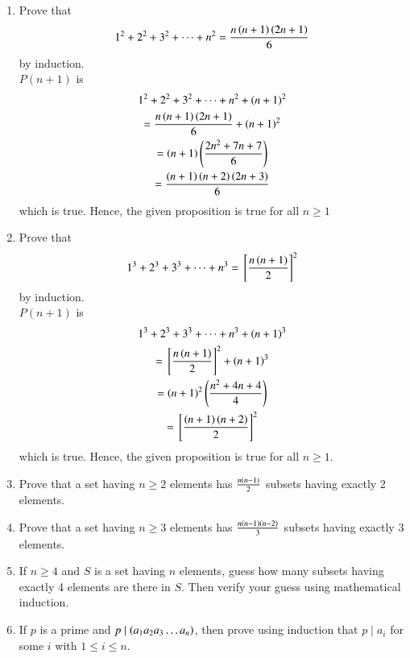 \renewcommand{\theequation}{\theenumi}

\begin{enumerate}[label=\arabic*.,ref=\thesubsection.\theenumi]
	\item Prove that 
		\begin{align}
			1^2 + 2^2 + 3^2 + \cdots + n^2 = \frac{n\left(n+1\right)\left(2n+1\right)}{6}
		\end{align}
		by induction.
		\\
		\solution $P(n+1)$ is 
		\begin{multline}
			1^2 + 2^2 + 3^2 + \cdots + n^2 +\left(n+1\right)^2 
			\\
			= \frac{n\left(n+1\right)\left(2n+1\right)}{6}+\left(n+1\right)^2
			\\
			= \left(n+1\right)\left(\frac{2n^2+7n + 7}{6}\right)
			\\
			= \frac{\left(n+1\right)\left(n+2\right)\left(2n+3\right)}{6}
		\end{multline}
		which is true.  Hence, the given proposition is true for all $n \ge 1$
	\item Prove that 
		\begin{align}
			1^3 + 2^3 + 3^3 + \cdots + n^3 = {}\left[\frac{n\left(n+1\right)}{2}\right]^2
		\end{align}
		by induction.
		\\
		\solution $P(n+1)$ is 
		\begin{multline}
			1^3 + 2^3 + 3^3 + \cdots + n^3 +\left(n+1\right)^3 
			\\
			= {}\left[\frac{n\left(n+1\right)}{2}\right]^2+\left(n+1\right)^3
			\\
			= \left(n+1\right)^2\left(\frac{n^2+4n + 4}{4}\right)
			\\
			= {}\left[\frac{\left(n+1\right)\left(n+2\right)}{2}\right]^2
		\end{multline}
		which is true.  Hence, the given proposition is true for all $n \ge 1$.
	\item Prove that a set having $n \ge 2$ elements has $\frac{n\left(n-1\right)}{2}$ subsets having exactly 2 elements.
	\item Prove that a set having $n \ge 3$ elements has $\frac{n\left(n-1\right)\left(n-2\right)}{3}$ subsets having exactly 3 elements.
	\item If $n \ge 4$ and $S$ is a set having $n$ elements, guess how many subsets having exactly 4 elements are there in $S$.  Then verify your guess using mathematical induction.
	\item If $p$ is a prime and $p \mid \left(a_1a_2a_3 \dots a_n\right)$, then prove using induction that $p \mid a_i$ for some $i$ with $1 \le i \le n$.  

\end{enumerate}
